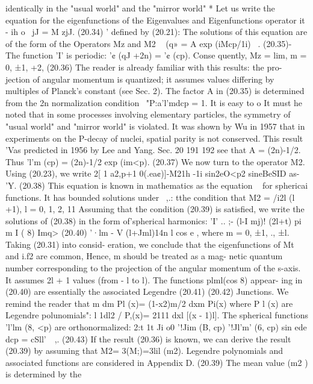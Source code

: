 \documentclass[a4paper,sfsidenotes,colorlinks=true]{tufte-book}
\numberwithin{equation}{section}
\numberwithin{figure}{section}
\begin{document}
{{    identically in the "usual world" and the "mirror world" * Let us
    write the equation for the eigenfunctions of the Eigenvalues and
    Eigenfunctions operator it - ih o~ jJ = M zjJ. (20.34) ' defined
    by (20.21): The solutions of this equation are of the form of the
    Operators Mz and M2 ~ (q» = A exp (iMcp/1i)~ . (20.35)- The
    function 'I' is periodic: '¢ (qJ +2n) = '¢ (cp). Conse quently, Mz
    = lim, m = 0, ±1, +2, (20.36) The reader is already familiar with
    this results: the pro- jection of angular momentum is quantized;
    it assumes values differing by multiples of Planck's constant (see
    Sec. 2). The factor A in (20.35) is determined from the 2n
    normalization condition ~"P:a'l'mdcp = 1. It is easy to o It must
    he noted that in some processes involving elementary particles,
    the symmetry of "usual world" and "mirror world" is violated. It
    was shown by Wu in 1957 that in experiments on the P-decay of
    nuclei, spatial parity is not conserved. This result 'Vas
    predicted in 1956 by Lee and Yang.  Sec. 20 191 192 see that A =
    (2n)-1/2. Thus 'l'm (cp) = (2n)-1/2 exp (im<p). (20.37) We now
    turn to the operator M2. Using (20.23), we write 2[ 1 a2,p+1
    0(.ea¢)]-M21h -1i sin2eO<p2 sineBeSID as- 'Y.  (20.38) This
    equation is known in mathematics as the equation ~ for sphericai
    functions. It has bounded solutions under ~,.: tthe condition that
    M2 = /i2l (l +1), l = 0, 1, 2, 11 Assuming that the condition
    (20.39) is satisfied, we write the solutions of (20.38) in the
    form of'spherical harmonics: 'I' .. ;- (l-I mj)! (2l+t) pi m I (
    8) Imq> (20.40) '·lm - V (l+Jml)14n l cos e , where m = 0, ±1, .,
    ±l. Taking (20.31) into consid- eration, we conclude that the
    eigenfunctions of Mt and i.f2 are common, Hence, m should be
    treated as a mag- netic quantum number corresponding to the
    projection of the angular momentum of the s-axis. It assumes 2l +
    1 values (from - l to l). The functions plml(cos 8) appear- ing in
    (20.40) are essentially the associated Legendre (20.41) (20.42)
    Junctions. We remind the reader that m dm Pl (x)= (1-x2)m/2 dxm
    Pi(x) where P l (x) are Legendre polunomials": l 1dl2 / P,(x)=
    2111 dxl [(x - 1)l].  The spherical functions 'l'lm (8, <p) are
    orthonormalized: 2:t 1t Ji o0 '!Jim (B, cp) '!Jl'm' (6, cp) sin
    ede dcp = cSll'~~,. (20.43) If the result (20.36) is known, we can
    derive the result (20.39) by assuming that M2= 3(M;)=3lil (m2).
    Legendre polynomials and associated functions are considered in
    Appendix D.  (20.39) The mean value (m2 ) is determined by the
}}
\end{document}
